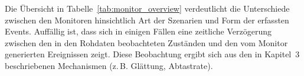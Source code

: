 Die Übersicht in Tabelle~\ref{tab:monitor_overview} verdeutlicht die
Unterschiede
zwischen den Monitoren hinsichtlich Art der Szenarien und Form der
erfassten Events.
Auffällig ist, dass sich in einigen Fällen eine zeitliche Verzögerung zwischen
den in den Rohdaten beobachteten Zuständen und den vom Monitor generierten
Ereignissen zeigt. Diese Beobachtung ergibt sich aus den in Kapitel~3
beschriebenen
Mechanismen (z.\,B. Glättung, Abtastrate).
